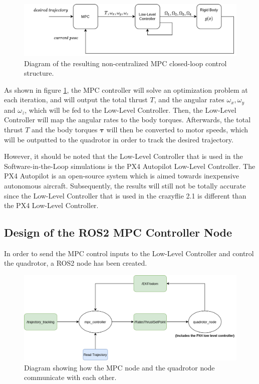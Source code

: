 \documentclass{thesisreport}
\begin{document}
\begin{figure}[h]
	\centering
	\includegraphics[width=\textwidth]{Images/diagrams/new_sim_diagram.png}
	\caption{Diagram of the resulting non-centralized MPC closed-loop control structure.}
	\label{fig:non_centralized_mpc_for_SIL}
\end{figure}

As shown in figure \ref{fig:non_centralized_mpc_for_SIL}, the MPC controller will solve an optimization problem at each iteration, and will output the total thrust $T$, and the angular rates $\omega_x, \omega_y$ and $\omega_z$, which will be fed to the Low-Level Controller. Then, the Low-Level Controller will map the angular rates to the body torques. Afterwards, the total thrust $T$ and the body torques $\bm{\tau}$ will then be converted to motor speeds, which will be outputted to the quadrotor in order to track the desired trajectory.

However, it should be noted that the Low-Level Controller that is used in the Software-in-the-Loop simulations is the PX4 Autopilot Low-Level Controller. The PX4 Autopilot \cite{px4_autopilot_2021} is an open-source system which is aimed towards inexpensive autonomous aircraft. Subsequently, the results will still not be totally accurate since the Low-Level Controller that is used in the crazyflie 2.1 is different than the PX4 Low-Level Controller.

\subsection{Design of the ROS2 MPC Controller Node}
 
 In order to send the MPC control inputs to the Low-Level Controller and control the quadrotor, a ROS2 node has been created.
 
 \begin{figure}[h]
 	\centering
 	\includegraphics[width=\textwidth]{Images/sil_simulations/ros2_node_diagram.png}
 	\caption{Diagram showing how the MPC node and the quadrotor node communicate with each other.}
 	\label{fig:ROS2_MPC_node}
 \end{figure}
\end{document}
